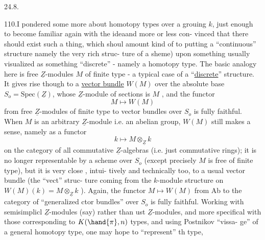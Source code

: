 

24.8.

110.\quad I pondered some more about homotopy types over a grouing $k$,
just enough to become familiar again with the idea\hand{,}and more or less con-%
vinced that there should exist such a thing, which  shoul amount\hand{,}
kind of\hand{,} to putting a ``continuous'' structure namely the very rich struc-%
ture of a sheme) upon something usually visualized as something ``discrete''
- namely a homotopy type. The basic analogy here is free $\underline{Z}$-modules $M$
of finite type - a typical case of a ``\uline{discrete}'' structure. It gives
rise though to a \uline{vector bundle} $W(M)$ over the absolute base $S_o=\mathrm{Spec}(\underline{Z})$,
whose $\underline{Z}$-module of sections is $M$ , and the functor
\[ M \mapsto W(M) \]
from free $\underline{Z}$-modules of finite type to vector bundles over $S_o$ is fully
faithful. When $M$ is an arbitrary $\underline{Z}$-module i.e. an abelian group, $W(M)$
still makes a sense, namely as a functor
\[ k \mapsto M\otimes_{\underline{Z}}k \]
on the category of all commutative $\underline{Z}$-algebras (i.e. just commutative
rings); it is no longer representable by a scheme over $S_o$ (except 
precisely  $M$ is free of finite type), but it is very close , intui-%
tively and technically too, to a usual vector bundle (the ``vect'' struc-%
ture coming from the $k$-module structure on $W(M)(k) = M\otimes_{\underline{Z}}k$ ). Again,
the functor $M\mapsto W(M)$ from Ab to the category of ``generalized ctor
bundles'' over $S_o$ is fully faithful. Working with semisimplicl
$\underline{Z}$-modules (say) rather than ust $\underline{Z}$-modules, and more specifical
with those corresponding to $K(\hand{\pi},n)$ types, and using Postnikov ``vissa-%
ge'' of a general homotopy type, one may hope to ``represent'' th type,
